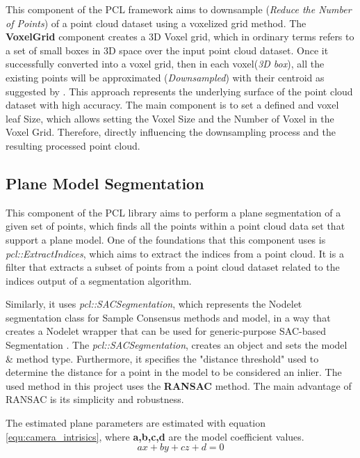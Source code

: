 \documentclass[12pt]{report}
\begin{document}
This component of the PCL  framework aims to downsample (\textit{Reduce the Number of Points}) of a point cloud dataset using a voxelized grid method.
The \textbf{VoxelGrid} component creates a 3D Voxel grid, which in ordinary terms refers to a set of small boxes in 3D space over the input point cloud dataset. 
Once it successfully converted into a voxel grid, then in each voxel(\textit{3D box}), all the existing points will be approximated (\textit{Downsampled}) with their centroid as suggested by .
This approach represents the underlying surface of the point cloud dataset with high accuracy.
The main component is to set a defined and voxel leaf Size, which allows setting the Voxel Size and the Number of Voxel in the Voxel Grid. Therefore, directly influencing the downsampling process and the resulting processed point cloud.





\subsection{Plane Model Segmentation}
\label{section:Plane Model Segmentation}
This component of the PCL library aims to perform a plane segmentation of a given set of points, which finds all the points within a point cloud data set that support a plane model.
One of the foundations that this component uses is \textit{pcl::ExtractIndices}, which aims to extract the indices from a point cloud.
It is a filter that extracts a subset of points from a point cloud dataset related to the indices output of a segmentation algorithm.

Similarly, it uses \textit{pcl::SACSegmentation}, which represents the Nodelet segmentation class for Sample Consensus methods and model, in a way that creates a Nodelet wrapper that can be used
for generic-purpose SAC-based Segmentation .
The \textit{pcl::SACSegmentation}, creates an object and sets the model \& method type. Furthermore, it specifies the "distance threshold" used to determine the distance for a point in the model to be considered an inlier.
The used method in this project uses the \textbf{RANSAC} method. The main advantage of RANSAC is its simplicity and robustness. 

The estimated plane parameters are estimated with equation \ref{equ:camera_intrisics}, where \textbf{a,b,c,d} are the model coefficient values.
\begin{equation}
  ax + by + cz + d = 0
\end{equation}
\label{equ:plane_param}
\end{document}
